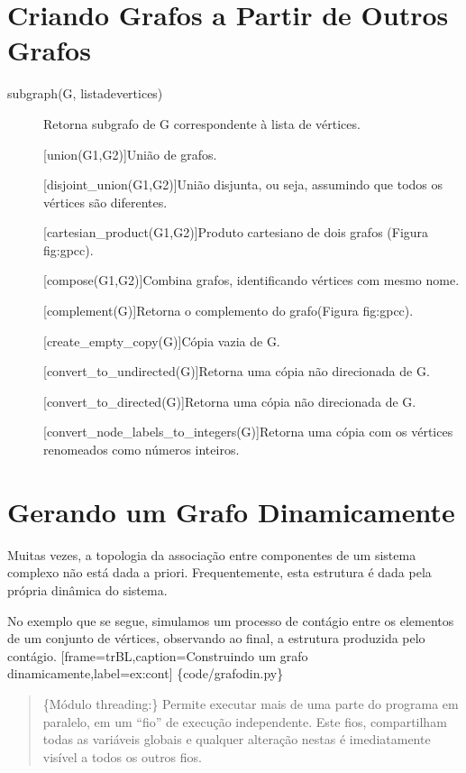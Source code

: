 \documentclass[a4paper,10pt,portuguese]{sphinxmanual}
\begin{document}
\section{Criando Grafos a Partir de Outros Grafos}
\label{capgraph:criando-grafos-a-partir-de-outros-grafos}\begin{description}
\item[{subgraph(G, listadevertices)}] \leavevmode
Retorna subgrafo de G correspondente à lista de vértices.

{[}union(G1,G2){]}União de grafos.

{[}disjoint\_union(G1,G2){]}União disjunta, ou seja, assumindo que
todos os vértices são diferentes.

{[}cartesian\_product(G1,G2){]}Produto cartesiano de dois grafos
(Figura fig:gpcc).

{[}compose(G1,G2){]}Combina grafos, identificando vértices com mesmo
nome.

{[}complement(G){]}Retorna o complemento do grafo(Figura fig:gpcc).

{[}create\_empty\_copy(G){]}Cópia vazia de G.

{[}convert\_to\_undirected(G){]}Retorna uma cópia não direcionada de
G.

{[}convert\_to\_directed(G){]}Retorna uma cópia não direcionada de G.

{[}convert\_node\_labels\_to\_integers(G){]}Retorna uma cópia com os
vértices renomeados como números inteiros.

\end{description}


\section{Gerando um Grafo Dinamicamente}
\label{capgraph:gerando-um-grafo-dinamicamente}
Muitas vezes, a topologia da associação entre componentes de um
sistema complexo não está dada a priori. Frequentemente, esta
estrutura é dada pela própria dinâmica do sistema.

No exemplo que se segue, simulamos um processo de contágio entre os
elementos de um conjunto de vértices, observando ao final, a
estrutura produzida pelo contágio.
{[}frame=trBL,caption=Construindo um grafo dinamicamente,label=ex:cont{]} \{code/grafodin.py\}
\begin{quote}

\{Módulo threading:\} Permite executar mais de uma parte do programa
em paralelo, em um ``fio'' de execução independente. Este fios,
compartilham todas as variáveis globais e qualquer alteração nestas
é imediatamente visível a todos os outros fios.
\end{quote}
\end{document}
